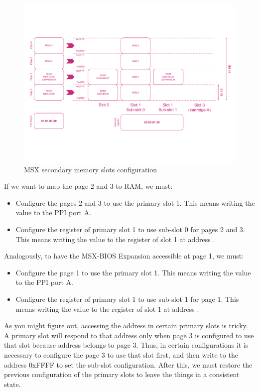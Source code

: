 \begin{figure}
	\centering
	\includegraphics[width=1\linewidth,trim={0cm 100 0 80}]{images/figures/msx-mem-slotssec}
	\caption{MSX secondary memory slots configuration}
	\label{fig:msx-mem-slotssec}
\end{figure}

If we want to map the page 2 and 3 to RAM, we must:
\begin{itemize}
	\item Configure the pages 2 and 3 to use the primary slot 1. This means writing the value  to the PPI port A.
	\item Configure the register of primary slot 1 to use sub-slot 0 for pages 2 and 3. This means writing the value  to the register of slot 1 at address .
\end{itemize}

Analogously, to have the MSX-BIOS Expansion accessible at page 1, we must:

\begin{itemize}
	\item Configure the page 1 to use the primary slot 1. This means writing the value  to the PPI port A.
	\item Configure the register of primary slot 1 to use sub-slot 1 for page 1. This means writing the value  to the register of slot 1 at address .
\end{itemize}

As you might figure out, accessing the address  in certain primary slots is tricky. A primary slot will respond to that address only when page 3 is configured to use that slot because address  belongs to page 3. Thus, in certain configurations it is necessary to configure the page 3 to use that slot first, and then write to the address 0xFFFF to set the sub-slot configuration. After this, we must restore the previous configuration of the primary slots to leave the things in a consistent state. 

